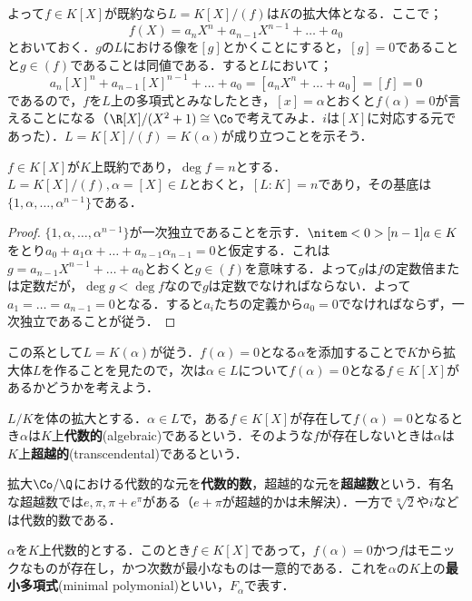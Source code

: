 よって$f\in K[X]$が既約なら$L=K[X]/(f)$は$K$の拡大体となる．ここで；
\[f(X)=a_nX^n+a_{n-1}X^{n-1}+\dots+a_0\]
とおいておく．$g$の$L$における像を$[g]$とかくことにすると，$[g]=0$であることと$g\in (f)$であることは同値である．すると$L$において；
\[a_n[X]^n+a_{n-1}[X]^{n-1}+\dots+a_0=[a_nX^n+\dots+a_0]=[f]=0\]
であるので，$f$を$L$上の多項式とみなしたとき，$[x]=\alpha$とおくと$f(\alpha)=0$が言えることになる（$\R[X]/(X^2+1)\cong\Co$で考えてみよ．$i$は$[X]$に対応する元であった）．$L=K[X]/(f)=K(\alpha)$が成り立つことを示そう．

\begin{prop}\label{prop:既約多項式の商による拡大}
	$f\in K[X]$が$K$上既約であり，$\deg f=n$とする．$L=K[X]/(f),\alpha=[X]\in L$とおくと，$[L:K]=n$であり，その基底は$\{1,\alpha,\dots,\alpha^{n-1}\}$である．
\end{prop}

\begin{proof}
	$\{1,\alpha,\dots,\alpha^{n-1}\}$が一次独立であることを示す．$\nitem<0>[n-1]{a}\in K$をとり$a_0+a_1\alpha+\dots+a_{n-1}\alpha_{n-1}=0$と仮定する．これは$g=a_{n-1}X^{n-1}+\dots+a_0$とおくと$g\in (f)$を意味する．よって$g$は$f$の定数倍または定数だが，$\deg g<\deg f$なので$g$は定数でなければならない．よって$a_1=\dots=a_{n-1}=0$となる．すると$a_i$たちの定義から$a_0=0$でなければならず，一次独立であることが従う．
\end{proof}

この系として$L= K(\alpha)$が従う．$f(\alpha)=0$となる$\alpha$を添加することで$K$から拡大体$L$を作ることを見たので，次は$\alpha\in L$について$f(\alpha)=0$となる$f\in K[X]$があるかどうかを考えよう．

\begin{defi}[代数的]
	$L/K$を体の拡大とする．$\alpha\in L$で，ある$f\in K[X]$が存在して$f(\alpha)=0$となるとき$\alpha$は$K$上\textbf{代数的}(algebraic)であるという．そのような$f$が存在しないときは$\alpha$は$K$上\textbf{超越的}(transcendental)であるという．
\end{defi}

拡大$\Co/\Q$における代数的な元を\textbf{代数的数}，超越的な元を\textbf{超越数}という．有名な超越数では$e,\pi,\pi+e^\pi$がある（$e+\pi$が超越的かは未解決）．一方で$\sqrt[n]{2}$や$i$などは代数的数である．

\begin{defi}[最小多項式]
	$\alpha$を$K$上代数的とする．このとき$f\in K[X]$であって，$f(\alpha)=0$かつ$f$はモニックなものが存在し，かつ次数が最小なものは一意的である．これを$\alpha$の$K$上の\textbf{最小多項式}(minimal polymonial)といい，$F_\alpha$で表す．
\end{defi}

